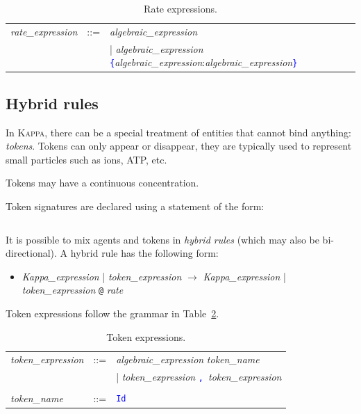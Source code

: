 \documentclass[11pt]{book}
\def\Kappa{\textsc{Kappa}}
\def\tcb#1{\textcolor{blue}{\ttt{#1}}}
\def\ttt#1{\texttt{#1}}
\def\rar{\rightarrow}
\def\ITE#1{\begin{itemize}#1\end{itemize}}
\def\imp#1{\emph{#1}\index{#1}}
\begin{document}
\begin{table}[ht!]
  \centering
  \caption{Rate expressions.}
  \begin{tabular}{@{} lcl @{}}
    \textit{rate\_expression} &::=& \textit{algebraic\_expression} \\
&&| \textit{algebraic\_expression} \tcb{\{}\textit{algebraic\_expression}:\textit{algebraic\_expression}\tcb{\}}
    \end{tabular}
  \label{tab:rates}
\end{table}

\subsection{Hybrid rules}\label{sec:hybrid}
In \Kappa{}, there can be a special treatment of entities that cannot
bind anything: \emph{tokens}.  Tokens can only appear or disappear,
they are typically used to represent small particles such as ions,
ATP, etc.

Tokens may have a continuous concentration.

Token signatures are declared using a statement
of the form:
\begin{lstlisting}[language=kappa]
%token: ca+ # Signature of calcium token
\end{lstlisting}

It is possible to mix agents and tokens in \imp{hybrid rules} (which
may also be bi-directional). A hybrid rule has the following form:

\ITE{
\item[] {\it Kappa\_expression} | {\it token\_expression} $\rar$ {\it Kappa\_expression}  | {\it token\_expression }\ttt{@} {\it rate}
}

Token expressions follow the grammar in Table~\ref{tab:tokens}.
\begin{table}[ht!]
  \centering
  \caption{Token expressions.}
  \begin{tabular}{@{} lcl @{}}
   \textit{token\_expression} &::=&  \textit{algebraic\_expression} \textit{token\_name} \\
	&&|  \textit{token\_expression} \tcb{,}\ \textit{token\_expression} \\\\
   \textit{token\_name} &::=& \tcb{Id}\\
  \end{tabular}
  \label{tab:tokens}
\end{table}
\end{document}
